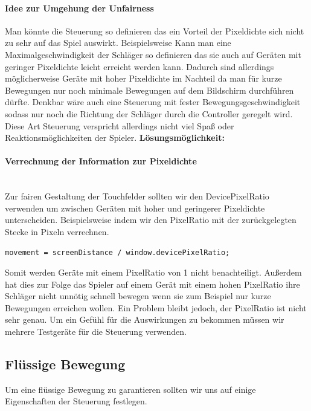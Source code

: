 \paragraph{Idee zur Umgehung der Unfairness} Man könnte die Steuerung so definieren das ein Vorteil der Pixeldichte sich nicht zu sehr auf das Spiel auswirkt. Beispielsweise Kann man eine Maximalgeschwindigkeit der Schläger so definieren das sie auch auf Geräten mit geringer Pixeldichte leicht erreicht werden kann. Dadurch sind allerdings möglicherweise Geräte mit hoher Pixeldichte im Nachteil da man für kurze Bewegungen nur noch minimale Bewegungen auf dem Bildschirm durchführen dürfte.
\newline
Denkbar wäre auch eine Steuerung mit fester Bewegungsgeschwindigkeit sodass nur noch die Richtung der Schläger durch die Controller geregelt wird. Diese Art Steuerung verspricht allerdings nicht viel Spaß oder Reaktionsmöglichkeiten der Spieler.
\newline
\newline
\textbf{Lösungsmöglichkeit:}
\paragraph{Verrechnung der Information zur Pixeldichte} 
\mbox{}\\
Zur fairen Gestaltung der Touchfelder sollten wir den DevicePixelRatio verwenden um zwischen Geräten mit hoher und geringerer Pixeldichte unterscheiden.
\newline
Beispielsweise indem wir den PixelRatio mit der zurückgelegten Stecke in Pixeln verrechnen.
\begin{lstlisting}
movement = screenDistance / window.devicePixelRatio;
\end{lstlisting}
Somit werden Geräte mit einem PixelRatio von 1 nicht benachteiligt. Außerdem hat dies zur Folge das Spieler auf einem Gerät mit einem hohen PixelRatio ihre Schläger nicht unnötig schnell bewegen wenn sie zum Beispiel nur kurze Bewegungen erreichen wollen.
\newline 
Ein Problem bleibt jedoch, der PixelRatio ist nicht sehr genau. Um ein Gefühl für die Auswirkungen zu bekommen müssen wir mehrere Testgeräte für die Steuerung verwenden.
\subsection{Flüssige Bewegung}
Um eine flüssige Bewegung zu garantieren sollten wir uns auf einige Eigenschaften der Steuerung festlegen.
